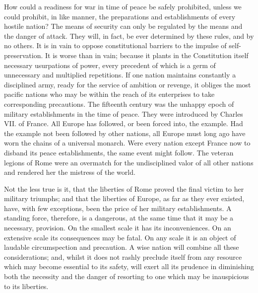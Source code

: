 How could a readiness for war in time of peace be safely prohibited, unless we could prohibit, in like manner, the preparations and establishments of every hostile nation? 
The means of security can only be regulated by the means and the danger of attack. 
They will, in fact, be ever determined by these rules, and by no others. 
It is in vain to oppose constitutional barriers to the impulse of self-preservation. 
It is worse than in vain; because it plants in the Constitution itself necessary usurpations of power, every precedent of which is a germ of unnecessary and multiplied repetitions. 
If one nation maintains constantly a disciplined army, ready for the service of ambition or revenge, it obliges the most pacific nations who may be within the reach of its enterprises to take corresponding precautions. 
The fifteenth century was the unhappy epoch of military establishments in the time of peace. 
They were introduced by Charles VII. 
of France. 
All Europe has followed, or been forced into, the example. 
Had the example not been followed by other nations, all Europe must long ago have worn the chains of a universal monarch. 
Were every nation except France now to disband its peace establishments, the same event might follow. 
The veteran legions of Rome were an overmatch for the undisciplined valor of all other nations and rendered her the mistress of the world.

Not the less true is it, that the liberties of Rome proved the final victim to her military triumphs; and that the liberties of Europe, as far as they ever existed, have, with few exceptions, been the price of her military establishments. 
A standing force, therefore, is a dangerous, at the same time that it may be a necessary, provision. 
On the smallest scale it has its inconveniences. 
On an extensive scale its consequences may be fatal. 
On any scale it is an object of laudable circumspection and precaution. 
A wise nation will combine all these considerations; and, whilst it does not rashly preclude itself from any resource which may become essential to its safety, will exert all its prudence in diminishing both the necessity and the danger of resorting to one which may be inauspicious to its liberties.


